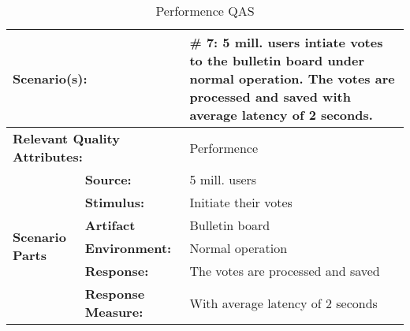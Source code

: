 \begin{table}[H]
\begin{center}
\begin{tabular}{|p{0.3cm}|p{2.5cm}|p{8cm}|}
  \hline
  \multicolumn{2}{|p{3cm}|}{\bfseries Scenario(s):} & \#  7: 5 mill. users intiate votes to the bulletin board under normal operation. The votes are processed and saved with average latency of 2 seconds.\\
  \hline
  \multicolumn{2}{|p{3cm}|}{\bfseries Relevant Quality Attributes:} & Performence\\
  \hline
  \multirow{6}{*}{\begin{sideways}{\bfseries Scenario Parts}\end{sideways}}
  & {\bfseries Source:} & 5 mill. users \\
  \cline{2-3}
  & {\bfseries Stimulus:} & Initiate their votes \\
  \cline{2-3}
  & {\bfseries Artifact} &  Bulletin board \\
  \cline{2-3}
  & {\bfseries Environment:} &  Normal operation \\
  \cline{2-3}
  & {\bfseries Response:} &  The votes are processed and saved\\
  \cline{2-3}
  & {\bfseries Response Measure:} &  With average latency of 2 seconds\\
  \hline
\end{tabular}
\caption{Performence QAS}
\end{center}
\end{table}



